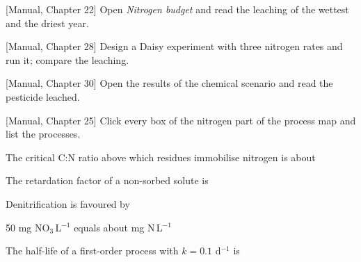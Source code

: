 \begin{exlist}
\item {\color{khblue}[Manual, Chapter 22]} Open \emph{Nitrogen budget} and read the leaching of the wettest and the driest year.\par{}
\item {\color{khblue}[Manual, Chapter 28]} Design a Daisy experiment with three nitrogen rates and run it; compare the leaching.\par{}
\item {\color{khblue}[Manual, Chapter 30]} Open the results of the chemical scenario and read the pesticide leached.\par{}
\item {\color{khblue}[Manual, Chapter 25]} Click every box of the nitrogen part of the process map and list the processes.\par{}
\end{exlist}
\begin{exlist}
\item The critical C:N ratio above which residues immobilise nitrogen is about
\item The retardation factor of a non-sorbed solute is
\item Denitrification is favoured by
\item 50 mg NO$_3$\,L$^{-1}$ equals about mg N\,L$^{-1}$
\item The half-life of a first-order process with $k=0.1$ d$^{-1}$ is
\end{exlist}
